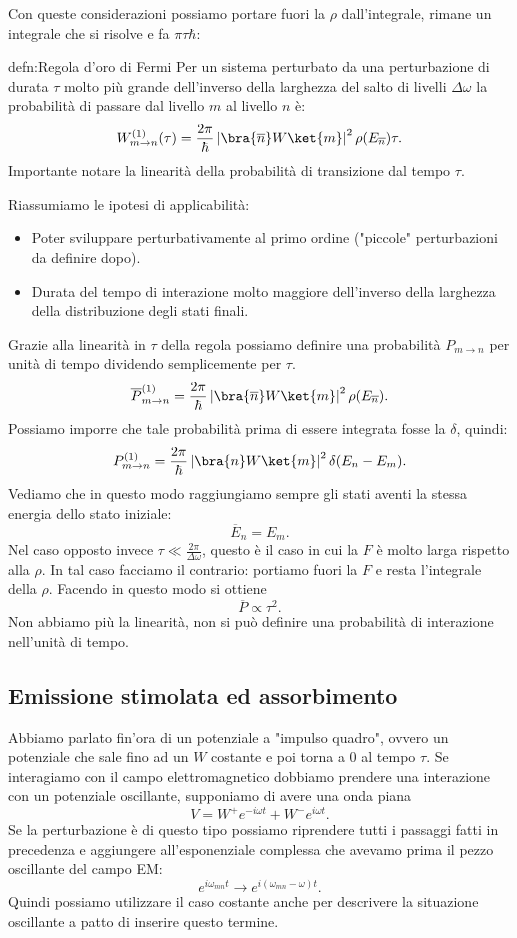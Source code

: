 \noindent
Con queste considerazioni possiamo portare fuori la $\rho$ dall'integrale, rimane un integrale che si risolve e fa $\pi \tau \hbar $:
\begin{defn}{defn:Regola d'oro di Fermi}
    Per un sistema perturbato da una perturbazione di durata $\tau$ molto più grande dell'inverso della larghezza del salto di livelli $\Delta\omega$  la probabilità di passare dal livello $m$ al livello $n$ è:
\[
    W^{(1)}_{m\to n}(\tau) =
    \frac{2\pi}{\hbar}\left|\bra{\overline{n}}W \ket{m}\right|^2\rho(E_{\overline{n}})\tau 
.\] 
Importante notare la linearità della probabilità di transizione dal tempo $\tau$.
\end{defn}
Riassumiamo le ipotesi di applicabilità:
\begin{itemize}
    \item Poter sviluppare perturbativamente al primo ordine ("piccole" perturbazioni da definire dopo).
    \item Durata del tempo di interazione molto maggiore dell'inverso della larghezza della distribuzione degli stati finali.
\end{itemize}
Grazie alla linearità in $\tau$ della regola possiamo definire una probabilità $P_{m\to n}$ per unità di tempo dividendo semplicemente per $\tau$.
\[
    \overline{P}_{m\to n}^{(1) } =
    \frac{2\pi}{\hbar}\left|\bra{\overline{n}}W \ket{m}\right|^2\rho(E_{\overline{n}})
.\] 
Possiamo imporre che tale probabilità prima di essere integrata fosse la $\delta$, quindi:
\[
    P_{m\to n}^{(1) } =
    \frac{2\pi}{\hbar}\left|\bra{n}W \ket{m}\right|^2\delta (E_n-E_m) 
.\] 
Vediamo che in questo modo raggiungiamo sempre gli stati aventi la stessa energia dello stato iniziale:
\[
    \overline{E}_n = E_m
.\] 
Nel caso opposto invece $\tau\ll\frac{2\pi }{\Delta\omega}$, questo è il caso in cui la $F$ è molto larga rispetto alla $\rho$.
In tal caso facciamo il contrario: portiamo fuori la $F$ e resta l'integrale della $\rho$. Facendo in questo modo si ottiene 
\[
\overline{P} \propto \tau^2
.\] 
Non abbiamo più la linearità, non si può definire una probabilità di interazione nell'unità di tempo.
\subsection{Emissione stimolata ed assorbimento}%
Abbiamo parlato fin'ora di un potenziale a "impulso quadro", ovvero un potenziale che sale fino ad un $W$  costante e poi torna a 0 al tempo $\tau$. Se interagiamo con il campo elettromagnetico dobbiamo prendere una interazione con un potenziale oscillante, supponiamo di avere una onda piana
\[
V=W^+ e^{-i\omega t} + W^- e^{i\omega t} 
.\] 
Se la perturbazione è di questo tipo possiamo riprendere tutti i passaggi fatti in precedenza e aggiungere all'esponenziale complessa che avevamo prima il pezzo oscillante del campo EM:
\[
    e^{i\omega_{mn}t} \to e^{i(\omega_{mn}-\omega)t }
.\] 
Quindi possiamo utilizzare il caso costante anche per descrivere la situazione oscillante a patto di inserire questo termine.
